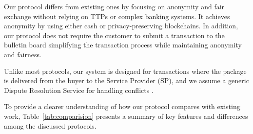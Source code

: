 \documentclass[pdftex,twocolumn,epjc3]{svjour3}
\begin{document}
Our protocol differs from existing ones by focusing on anonymity and fair exchange without relying on TTPs or complex banking systems. It achieves anonymity by using either cash or privacy-preserving blockchains. In addition, our protocol does not require the customer to submit a transaction to the bulletin board simplifying the transaction process while maintaining anonymity and fairness.

Unlike most protocols, our system is designed for transactions where the package is delivered from the buyer to the Service Provider (SP), and we assume a generic Dispute Resolution Service for handling conflicts .

To provide a clearer understanding of how our protocol compares with existing work, Table~\ref{tab:comparision} presents a summary of key features and differences among the discussed protocols.
\end{document}
